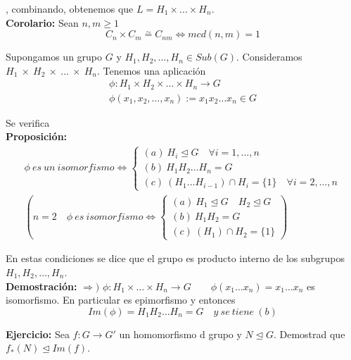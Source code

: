 \documentclass{article}
\begin{document}
, combinando, obtenemos que $L=H_1\times \ldots \times H_n$. \\

\textbf{Corolario:} Sean $n,m\geq 1$
\begin{equation*}
C_n\times C_m\overset{\sim}{=} C_{nm}\Leftrightarrow mcd(n,m)=1
\end{equation*}

Supongamos un grupo $G$ y $H_1,H_2,\ldots,H_n\in Sub(G)$. Consideramos $H_1~\times~ H_2~\times~\ldots~\times~H_n$. Tenemos una aplicación 
\begin{gather*}
\phi:H_1\times H_2\times \ldots \times H_n\longrightarrow G \\
\phi(x_1,x_2,\ldots,x_n):=x_1x_2\ldots x_n\in G
\end{gather*}

Se verifica \\

\textbf{Proposición:}
\begin{gather*}
\phi\:es\:un\:isomorfismo\Leftrightarrow\left\lbrace \begin{array}{c}
(a)\: H_i\unlhd G\quad \forall i=1,\ldots,n \\
(b)\: H_1H_2\ldots H_n=G\\
(c)\: (H_1\ldots H_{i-1})\cap H_i=\{1\} \quad \forall i=2,\ldots,n
\end{array}\right. \\
\left( n=2\quad \phi\:es\:isomorfismo \Leftrightarrow\left\lbrace \begin{array}{c}
(a)\: H_1\unlhd G\quad H_2\unlhd G  \\
(b)\: H_1H_2=G\\
(c)\: (H_1)\cap H_2=\{1\}
\end{array}\right. \right)
\end{gather*}

En estas condiciones se dice que el grupo es producto interno de los subgrupos $H_1,H_2,\ldots,H_n$. \\

\textbf{Demostración:} $\Rightarrow)$ $\phi:H_1\times \ldots \times H_n\longrightarrow G \qquad \phi(x_1\ldots x_n)=x_1\ldots x_n$ es isomorfismo. En particular es epimorfismo y entonces
\begin{equation*}
Im(\phi)=H_1H_2\ldots H_n=G\quad y\:se\:tiene\:(b)
\end{equation*}

\textbf{Ejercicio:} Sea $f:G\longrightarrow G'$ un homomorfismo d grupo y $N\unlhd G$. Demostrad que $f_*(N)\unlhd Im(f)$. \\
\end{document}
